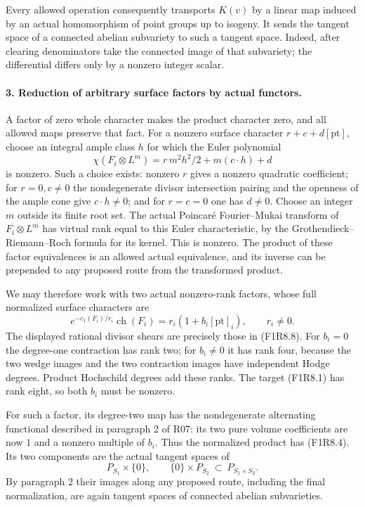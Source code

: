 Every allowed operation consequently transports $K(v)$ by a
linear map induced by an actual homomorphism of point groups
up to isogeny. It sends the tangent space of a connected abelian
subvariety to such a tangent space. Indeed, after clearing
denominators take the connected image of that subvariety;
the differential differs only by a nonzero integer scalar.

\paragraph{3. Reduction of arbitrary surface factors by actual functors.}
A factor of zero whole character makes the product character
zero, and all allowed maps preserve that fact. For a nonzero
surface character $r+c+d[\mathrm{pt}]$, choose an integral
ample class $h$ for which the Euler polynomial
\[
 \chi(F_i\otimes L^m)=r\,m^2h^2/2+m(c\cdot h)+d
 \tag{F1R8.10}
\]
is nonzero. Such a choice exists: nonzero $r$ gives a nonzero
quadratic coefficient; for $r=0,c\ne0$ the nondegenerate
divisor intersection pairing and the openness of the ample
cone give $c\cdot h\ne0$; and for $r=c=0$ one has $d\ne0$.
Choose an integer $m$ outside its finite root set. The actual
Poincar\'e Fourier--Mukai transform of $F_i\otimes L^m$ has
virtual rank equal to this Euler characteristic, by the
Grothendieck--Riemann--Roch formula for its kernel. This is
nonzero. The product of these factor equivalences is an
allowed actual equivalence, and its inverse can be prepended
to any proposed route from the transformed product.

We may therefore work with two actual nonzero-rank factors,
whose full normalized surface characters are
\[
 e^{-c_1(F_i)/r_i}\operatorname{ch}(F_i)
       =r_i(1+b_i[\mathrm{pt}]_i),\qquad r_i\ne0.
 \tag{F1R8.11}
\]
The displayed rational divisor shears are precisely those in
(F1R8.8). For $b_i=0$ the degree-one contraction has rank two;
for $b_i\ne0$ it has rank four, because the two wedge images
and the two contraction images have independent Hodge degrees.
Product Hochschild degrees add these ranks. The target
(F1R8.1) has rank eight, so both $b_i$ must be nonzero.

For such a factor, its degree-two map has the nondegenerate
alternating functional described in paragraph 2 of R07: its
two pure volume coefficients are now $1$ and a nonzero
multiple of $b_i$. Thus the normalized product has (F1R8.4).
Its two components are the actual tangent spaces of
\[
 P_{S_1}\times\{0\},\qquad \{0\}\times P_{S_2}
       \ \subset\ P_{S_1\times S_2}.
 \tag{F1R8.12}
\]
By paragraph 2 their images along any proposed route, including
the final normalization, are again tangent spaces of connected
abelian subvarieties.

